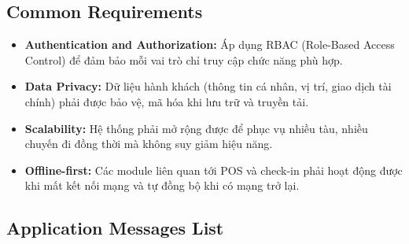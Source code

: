 \subsection{Common Requirements}
\begin{itemize}
    \item \textbf{Authentication and Authorization:} Áp dụng RBAC
    (Role-Based Access Control) để đảm bảo mỗi vai trò chỉ truy cập chức
    năng phù hợp.
    \item \textbf{Data Privacy:} Dữ liệu hành khách (thông tin cá nhân,
    vị trí, giao dịch tài chính) phải được bảo vệ, mã hóa khi lưu trữ và
    truyền tải.
    \item \textbf{Scalability:} Hệ thống phải mở rộng được để phục vụ
    nhiều tàu, nhiều chuyến đi đồng thời mà không suy giảm hiệu năng.
    \item \textbf{Offline-first:} Các module liên quan tới POS và
    check-in phải hoạt động được khi mất kết nối mạng và tự đồng bộ khi
    có mạng trở lại.
\end{itemize}

\subsection{Application Messages List}

